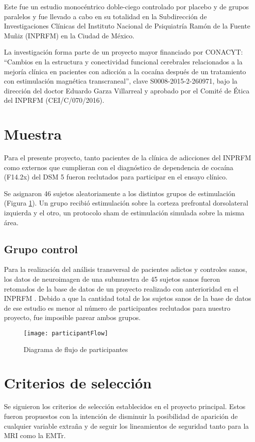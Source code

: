 Este fue un estudio monocéntrico doble-ciego controlado por placebo y de grupos paralelos y fue llevado a cabo en su totalidad en la Subdirección de Investigaciones Clínicas del Instituto Nacional de Psiquiatría Ramón de la Fuente Muñiz (INPRFM) en la Ciudad de México.\par
La investigación forma parte de un proyecto mayor financiado por CONACYT:
``Cambios en la estructura y conectividad funcional cerebrales relacionados a la mejoría clínica en pacientes con adicción a la cocaína después de un tratamiento con estimulación magnética transcraneal'',
clave S0008-2015-2-260971, bajo la dirección del doctor Eduardo Garza Villarreal y aprobado por el Comité de Ética del INPRFM (CEI/C/070/2016).

\section{Muestra}
Para el presente proyecto, tanto pacientes de la clínica de adicciones del INPRFM como externos que cumplieran con el diagnóstico de dependencia de cocaína (F14.2x) del DSM 5 \parencite{APA2013} fueron reclutados para participar en el ensayo clínico.\par
Se asignaron 46 sujetos aleatoriamente a los distintos grupos de estimulación (Figura \ref{fig:flow}).
Un grupo recibió estimulación sobre la corteza prefrontal dorsolateral izquierda y el otro, un protocolo sham de estimulación simulada sobre la misma área.

\subsection{Grupo control}
Para la realización del análisis transversal de pacientes adictos y controles sanos, los datos de neuroimagen de una submuestra de 45 sujetos sanos fueron retomados de la base de datos de un proyecto realizado con anterioridad en el INPRFM \parencite{Garza2017}.
Debido a que la cantidad total de los sujetos sanos de la base de datos de ese estudio es menor al número de participantes reclutados para nuestro proyecto, fue imposible parear ambos grupos.

\begin{figure}[H]
    \centering
    \texttt{[image: participantFlow]}
    \caption{Diagrama de flujo de participantes}
    \label{fig:flow}
\end{figure}

\section{Criterios de selección}
Se siguieron los criterios de selección establecidos en el proyecto principal.
Estos fueron propuestos con la intención de disminuir la posibilidad de aparición de cualquier variable extraña y de seguir los lineamientos de seguridad tanto para la MRI como la EMTr.

